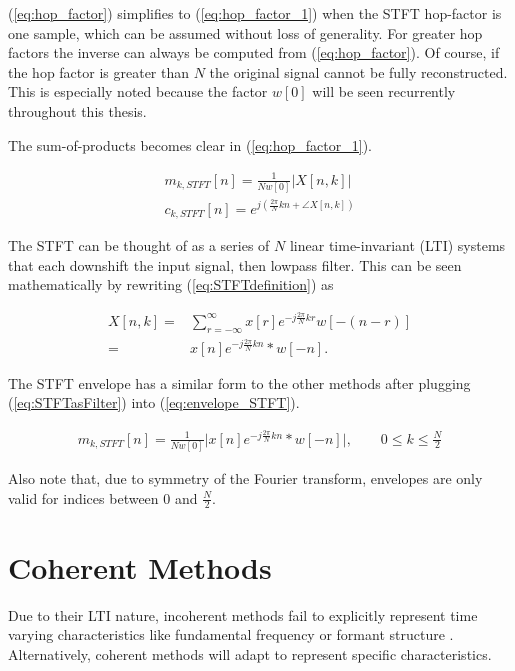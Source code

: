 \documentclass [11pt, proquest,oneside] {ganter_thesis}[2015/03/03]
\begin{document}
(\ref{eq:hop_factor}) simplifies to (\ref{eq:hop_factor_1}) when the STFT hop-factor is one sample, which can be assumed without loss of generality.  For greater hop factors the inverse can always be computed from (\ref{eq:hop_factor}).  Of course, if the hop factor is greater than $N$ the original signal cannot be fully reconstructed.  This is especially noted because the factor $w[0]$ will be seen recurrently throughout this thesis.

The sum-of-products becomes clear in (\ref{eq:hop_factor_1}).

\begin{align}
\label{eq:envelope_STFT}
m_{k,STFT}[n] =  \frac{1}{Nw[0]}  \vert X[n,k]\vert \\
c_{k,STFT}[n] = e^{j(\frac{2\pi}{N}kn + \angle X[n,k])}
\end{align}

The STFT can be thought of as a series of $N$ linear time-invariant (LTI) systems that each downshift the input signal, then lowpass filter.  This can be seen mathematically by rewriting (\ref{eq:STFTdefinition}) as

\begin{align}
X[n,k] =& \sum\limits_{r=-\infty}^{\infty} x[r] e^{-j\frac{2\pi}{N}kr} w[-(n - r)] \nonumber \\
\label{eq:STFTasFilter}
=& x[n] e^{-j\frac{2\pi}{N}kn} * w[-n].
\end{align}

The STFT envelope has a similar form to the other methods after plugging (\ref{eq:STFTasFilter}) into (\ref{eq:envelope_STFT}).

\begin{align}
\label{eq:STFT_envelope}
m_{k,STFT}[n] =  \frac{1}{Nw[0]}  \Big\vert x[n] e^{-j\frac{2\pi}{N}kn} * w[-n] \Big\vert, \qquad 0 \leq k \leq \frac{N}{2}
\end{align}

Also note that, due to symmetry of the Fourier transform, envelopes are only valid for indices between $0$ and $\frac{N}{2}$.

\section{Coherent Methods}

Due to their LTI nature, incoherent methods fail to explicitly represent time varying characteristics like fundamental frequency or formant structure \cite{wilson1993design}.  Alternatively, coherent methods will adapt to represent specific characteristics.
\end{document}
